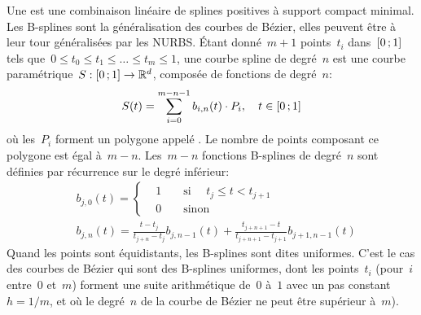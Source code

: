 Une  est une combinaison linéaire de splines positives à support compact minimal. Les B-splines sont la généralisation des courbes de Bézier, elles peuvent être à leur tour généralisées par les NURBS. Étant donné~$m+1$ points~$t_i$ dans~$\mathopen{[}0\,;1\mathclose{]}$ tels que~$0\le t_0\le t_1\le\ldots\le t_m\le 1$, une courbe spline de degré~$n$ est une courbe paramétrique~$S:\mathopen{[}0\,;1\mathclose{]}\to\mathbb{R}^d$, composée de fonctions  de degré~$n$: 
\begin{equation}
S(t)=\sum_{i=0}^{m-n-1}b_{i,n}(t)\cdot P_{i},\quad t \in \mathopen{[}0\,;1\mathclose{]}
\end{equation}
où les~$P_i$ forment un polygone appelé . Le nombre de points composant ce polygone est égal à~$m-n$. Les~$m-n$ fonctions B-splines de degré~$n$ sont définies par récurrence sur le degré inférieur: 
\begin{align}
&b_{j, 0}(t)= \left\{ 
\begin{aligned} &1 && \text{ si } \quad t_j \leqslant t < t_{j + 1} \\
&0 && \text{ sinon } 
\end{aligned} \right.\\
&b_{j, n}(t)= \frac{t - t_j}{t_{j + n} - t_j} b_{j, n - 1}(t) + \frac{t_{j + n + 1} - t}{t_{j + n + 1} - t_{j + 1}} b_{j + 1, n - 1}(t)
\end{align}
Quand les points sont équidistants, les B-splines sont dites uniformes. C'est le cas des courbes de Bézier qui sont des B-splines uniformes, dont les points~$t_i$ (pour~$i$ entre~$0$ et~$m$) forment une suite arithmétique de~$0$ à~$1$ avec un pas constant~$h=1/m$, et où le degré~$n$ de la courbe de Bézier ne peut être supérieur à~$m$). 

 
 
